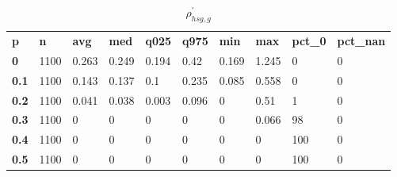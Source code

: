 \begin{table}[h]
 \centering 
\footnotesize
\caption{$\rho_{hsg,g}^\prime $}
\label{tab:alphahsgg}
\begin{tabular}[h]{| l l l l l l l l l l|
    } \hline
\textbf{ p} & \textbf{ n} & \textbf{ avg} & \textbf{ med} & \textbf{ q025} & \textbf{ q975} & \textbf{ min} & \textbf{ max} & \textbf{ pct\_0} & \textbf{ pct\_nan}
           \\
  \textbf{  0} & 1100 & 0.263 & 0.249 & 0.194 &  0.42 & 0.169 & 1.245 &   0 & 0
           \\
  \textbf{0.1} & 1100 & 0.143 & 0.137 &   0.1 & 0.235 & 0.085 & 0.558 &   0 & 0
           \\
  \textbf{0.2} & 1100 & 0.041 & 0.038 & 0.003 & 0.096 &     0 &  0.51 &   1 & 0
           \\
  \textbf{0.3} & 1100 &     0 &     0 &     0 &     0 &     0 & 0.066 &  98 & 0
           \\
  \textbf{0.4} & 1100 &     0 &     0 &     0 &     0 &     0 &     0 & 100 & 0
           \\
  \textbf{0.5} & 1100 &     0 &     0 &     0 &     0 &     0 &     0 & 100 & 0
           \\
 \hline \end{tabular}
 \end{table}
